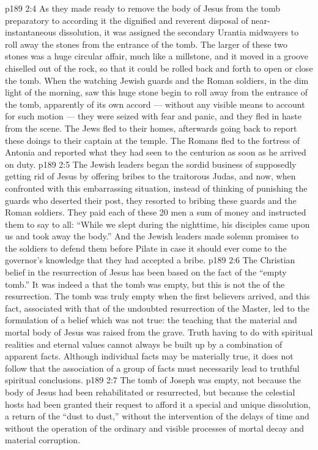 \vs p189 2:4 As they made ready to remove the body of Jesus from the tomb preparatory to according it the dignified and reverent disposal of near\hyp{}instantaneous dissolution, it was assigned the secondary Urantia midwayers to roll away the stones from the entrance of the tomb. The larger of these two stones was a huge circular affair, much like a millstone, and it moved in a groove chiselled out of the rock, so that it could be rolled back and forth to open or close the tomb. When the watching Jewish guards and the Roman soldiers, in the dim light of the morning, saw this huge stone begin to roll away from the entrance of the tomb, apparently of its own accord --- without any visible means to account for such motion --- they were seized with fear and panic, and they fled in haste from the scene. The Jews fled to their homes, afterwards going back to report these doings to their captain at the temple. The Romans fled to the fortress of Antonia and reported what they had seen to the centurion as soon as he arrived on duty.
\vs p189 2:5 The Jewish leaders began the sordid business of supposedly getting rid of Jesus by offering bribes to the traitorous Judas, and now, when confronted with this embarrassing situation, instead of thinking of punishing the guards who deserted their post, they resorted to bribing these guards and the Roman soldiers. They paid each of these 20 men a sum of money and instructed them to say to all: “While we slept during the nighttime, his disciples came upon us and took away the body.” And the Jewish leaders made solemn promises to the soldiers to defend them before Pilate in case it should ever come to the governor’s knowledge that they had accepted a bribe.
\vs p189 2:6 \pc The Christian belief in the resurrection of Jesus has been based on the fact of the “empty tomb.” It was indeed a  that the tomb was empty, but this is not the  of the resurrection. The tomb was truly empty when the first believers arrived, and this fact, associated with that of the undoubted resurrection of the Master, led to the formulation of a belief which was not true: the teaching that the material and mortal body of Jesus was raised from the grave. Truth having to do with spiritual realities and eternal values cannot always be built up by a combination of apparent facts. Although individual facts may be materially true, it does not follow that the association of a group of facts must necessarily lead to truthful spiritual conclusions.
\vs p189 2:7 The tomb of Joseph was empty, not because the body of Jesus had been rehabilitated or resurrected, but because the celestial hosts had been granted their request to afford it a special and unique dissolution, a return of the “dust to dust,” without the intervention of the delays of time and without the operation of the ordinary and visible processes of mortal decay and material corruption.
